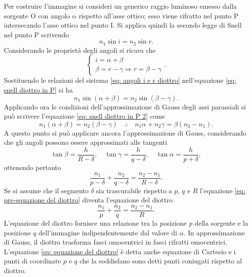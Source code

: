 Per costruire l'immagine si consideri un generico raggio luminoso emesso dalla sorgente O con angolo $\alpha$ rispetto all'asse ottico; esso viene rifratto nel punto P intersecando l'asse ottico nel punto I. Si applica quindi la secondo legge di Snell nel punto P scrivendo 
\begin{equation}
    \label{eq: snell diottro in P}
    n_1\sin{i}=n_2\sin{r}.
\end{equation}
Considerando le proprietà degli angoli si ricava che
\begin{equation}
    \begin{cases}
        \label{eq: angoli i e r diottro}
        i=\alpha+\beta \\
        \beta=r-\gamma\Rightarrow r=\beta-\gamma
    \end{cases}.
\end{equation}
Sostituendo le relazioni del sistema \eqref{eq: angoli i e r diottro} nell'equazione \eqref{eq: snell diottro in P} si ha
\begin{equation}
    \label{eq: snell diottro in P 2}
    n_1\sin{(\alpha+\beta)}=n_2\sin{(\beta-\gamma)}.
\end{equation}
Applicando ora le condizioni dell'approssimazione di Gauss degli assi parassiali si può scrivere l'equazione \eqref{eq: snell diottro in P 2} come
\begin{equation}
    n_1(\alpha+\beta)=n_2(\beta-\gamma)\quad\therefore\quad n_1\alpha +n_2\gamma=\beta(n_2-n_1).
\end{equation}
A questo punto si può applicare ancora l'approssimazione di Gauss, considerando che gli angoli possono essere approssimati alle tangenti
\begin{equation}
\tan{\beta}=\dfrac{h}{R-\delta},\quad\tan{\gamma}=\dfrac{h}{q-\delta},\quad\tan{\alpha}=\dfrac{h}{p+\delta},
\end{equation}
ottenendo pertanto
\begin{equation}
    \label{eq: pre-equazione del diottro}
    \frac{n_1}{p-\delta}+\frac{n_2}{q-\delta}=\frac{n_2-n_1}{R-\delta}.
\end{equation}
Se si assume che il segmento $\delta$ sia trascurabile rispetto a $p$, $q$ e $R$ l'equazione \eqref{eq: pre-equazione del diottro} diventa l'equazione del diottro
\begin{equation}
    \label{eq: equazione del diottro}
    \frac{n_1}{p}+\frac{n_2}{q}=\frac{n_2-n_1}{R}.
\end{equation}
L'equazione del diottro fornisce una relazione tra la posizione $p$ della sorgente e la posizione $q$ dell'immagine indipendentemente dal valore di $\alpha$. In approssimazione di Gauss, il diottro trasforma fasci omocentrici in fasci rifratti omocentrici. L'equazione \eqref{eq: equazione del diottro} è detta anche equazione di Cartesio e i punti di coordinate $p$ e $q$ che la soddisfano sono detti punti coniugati rispetto al diottro.


